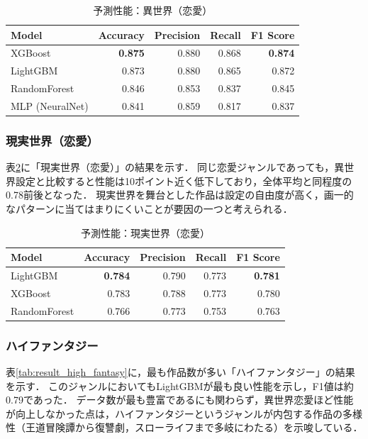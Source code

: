 \documentclass[uplatex, dvipdfmx, 11pt, a4paper, report]{jsbook}
\begin{document}
\begin{table}[H]
  \centering
  \caption{予測性能：異世界（恋愛）}
  \label{tab:result_isekai_love}
  \begin{tabular}{lrrrr} \hline
    Model & Accuracy & Precision & Recall & F1 Score \\ \hline
    XGBoost & \textbf{0.875} & 0.880 & 0.868 & \textbf{0.874} \\
    LightGBM & 0.873 & 0.880 & 0.865 & 0.872 \\
    RandomForest & 0.846 & 0.853 & 0.837 & 0.845 \\
    MLP (NeuralNet) & 0.841 & 0.859 & 0.817 & 0.837 \\ \hline
  \end{tabular}
\end{table}

\subsubsection{現実世界（恋愛）}
表\ref{tab:result_reality_love}に「現実世界（恋愛）」の結果を示す．
同じ恋愛ジャンルであっても，異世界設定と比較すると性能は10ポイント近く低下しており，全体平均と同程度の0.78前後となった．
現実世界を舞台とした作品は設定の自由度が高く，画一的なパターンに当てはまりにくいことが要因の一つと考えられる．

\begin{table}[H]
  \centering
  \caption{予測性能：現実世界（恋愛）}
  \label{tab:result_reality_love}
  \begin{tabular}{lrrrr} \hline
    Model & Accuracy & Precision & Recall & F1 Score \\ \hline
    LightGBM & \textbf{0.784} & 0.790 & 0.773 & \textbf{0.781} \\
    XGBoost & 0.783 & 0.788 & 0.773 & 0.780 \\
    RandomForest & 0.766 & 0.773 & 0.753 & 0.763 \\ \hline
  \end{tabular}
\end{table}

\subsubsection{ハイファンタジー}
表\ref{tab:result_high_fantasy}に，最も作品数が多い「ハイファンタジー」の結果を示す．
このジャンルにおいてもLightGBMが最も良い性能を示し，F1値は約0.79であった．
データ数が最も豊富であるにも関わらず，異世界恋愛ほど性能が向上しなかった点は，ハイファンタジーというジャンルが内包する作品の多様性（王道冒険譚から復讐劇，スローライフまで多岐にわたる）を示唆している．
\end{document}
